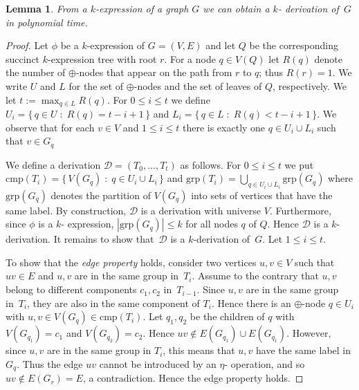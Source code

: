 \documentclass[10pt,usletter]{article}
\newtheorem{lemma}{Lemma}
\theoremstyle{remark}
\newcommand{\DDD}{\mathcal{D}}
\newcommand{\SB}{\{\,}\newcommand{\SM}{\;{:}\;}\newcommand{\SE}{\,\}}\newcommand{\Card}[1]{|#1|}
\newcommand{\hy}{\hbox{-}\nobreak\hskip0pt}
\newcommand{\comps}{\text{cmp}}
\newcommand{\groups}{\text{grp}}
\begin{document}
\begin{lemma}\label{lem:expression->derivation}
  From a $k$\hy expression of a graph $G$ we can obtain a $k$\hy
  derivation of~$G$ in polynomial time.
\end{lemma}
\begin{proof}
  Let $\phi$ be a $k$\hy expression of $G=(V,E)$ and let $Q$ be the
  corresponding succinct $k$\hy expression tree with root $r$.  For a
  node $q \in V(Q)$ let $R(q)$ denote the number of $\oplus$-nodes
  that appear on the path from $r$ to $q$; thus $R(r)=1$.  We write
  $U$ and $L$ for the set of $\oplus$\hy nodes and the set of leaves
  of $Q$, respectively.  We let $t:=\max_{q\in L} R(q)$.  For $0\leq i
  \leq t$ we define $U_i=\SB q\in U \SM R(q)=t-i+1 \SE$ and $L_i=\SB
  q\in L \SM R(q)< t-i+1 \SE$. We observe that for each $v\in V$ and
  $1\leq i \leq t$ there is exactly one $q\in U_i\cup L_i$ such that
  $v\in G_q$

  We define a derivation $\DDD=(T_0,\dots,T_t)$ as follows.   For
  $0 \leq i\leq t$ we
  put $\comps(T_i)=\SB V(G_q) \SM q\in U_i \cup L_i\SE$ and
  $\groups(T_i)=\bigcup_{q\in U_i \cup L_i} \groups(G_q)$ where
  $\groups(G_q)$ denotes the partition of $V(G_q)$ into sets of
  vertices that have the same label.  By construction, $\DDD$ is a
  derivation with universe $V$. Furthermore, since $\phi$ is a $k$\hy
  expression, $\Card{\groups(G_q)}\leq k$ for all nodes $q$ of
  $Q$. Hence $\DDD$ is a $k$\hy derivation.
It remains to show that~$\DDD$ is a $k$\hy derivation
    of~$G$. Let $1\leq i \leq t$.
 
    To show that the \emph{edge property} holds, consider two vertices
    $u,v\in V$ such that $uv\in E$ and $u,v$ are in the same group
    in~$T_i$.  Assume to the contrary that $u,v$ belong to different
    components $c_1,c_2$ in~$T_{i-1}$.  Since $u,v$ are in the same
    group in~$T_i$, they are also in the same component of $T_i$.
    Hence there is an $\oplus$\hy node $q\in U_i$ with $u,v\in
    V(G_q)\in \comps(T_i)$. Let $q_1,q_2$ be the children of $q$ with
    $V(G_{q_1})=c_1$ and $V(G_{q_2})=c_2$. Hence $uv\notin
    E(G_{q_1})\cup E(G_{q_1})$. However, since $u,v$ are in the same
    group in $T_i$, this means that $u,v$ have the same label in
    $G_q$. Thus the edge $uv$ cannot be introduced by an $\eta$\hy
    operation, and so $uv\notin E(G_{r})=E$, a contradiction. Hence
    the edge property holds.


\end{proof}
\end{document}

